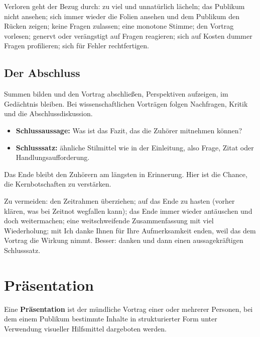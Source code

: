 \documentclass[12pt, a4paper]{article}
\begin{document}
Verloren geht der Bezug durch: zu viel und unnatürlich lächeln; das Publikum
nicht ansehen; sich immer wieder die Folien ansehen und dem Publikum den
Rücken zeigen; keine Fragen zulassen; eine monotone Stimme; den Vortrag
vorlesen; genervt oder verängstigt auf Fragen reagieren; sich auf Kosten
dummer Fragen profilieren; sich für Fehler rechtfertigen.

\subsection{Der Abschluss}

Summen bilden und den Vortrag abschließen, Perspektiven aufzeigen, im
Gedächtnis bleiben. Bei wissenschaftlichen Vorträgen folgen Nachfragen,
Kritik und die Abschlussdiskussion.

\begin{itemize}
  \item \textbf{Schlussaussage:} Was ist das Fazit, das die Zuhörer mitnehmen
        können?
  \item \textbf{Schlusssatz:} ähnliche Stilmittel wie in der Einleitung, also
        Frage, Zitat oder Handlungsaufforderung.
\end{itemize}

\begin{notebox}
Das Ende bleibt den Zuhörern am längsten in Erinnerung. Hier ist die Chance,
die Kernbotschaften zu verstärken.
\end{notebox}

Zu vermeiden: den Zeitrahmen überziehen; auf das Ende zu hasten (vorher
klären, was bei Zeitnot wegfallen kann); das Ende immer wieder antäuschen und
doch weitermachen; eine weitschweifende Zusammenfassung mit viel
Wiederholung; mit \glqq Ich danke Ihnen für Ihre Aufmerksamkeit\grqq{} enden,
weil das dem Vortrag die Wirkung nimmt. Besser: danken und dann einen
aussagekräftigen Schlusssatz.

\section{Präsentation}

\begin{definitionbox}
Eine \textbf{Präsentation} ist der mündliche Vortrag einer oder mehrerer
Personen, bei dem einem Publikum bestimmte Inhalte in strukturierter Form
unter Verwendung visueller Hilfsmittel dargeboten werden.
\end{definitionbox}
\end{document}

